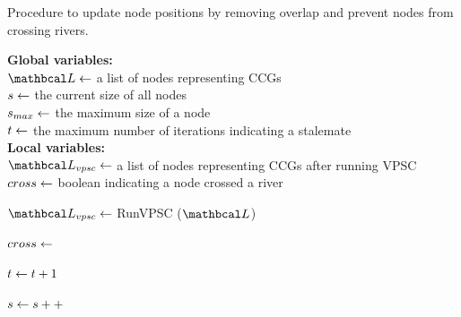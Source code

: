 \begin{algorithm}[tb!]
    \caption{Procedure to update node positions by removing overlap and prevent nodes from crossing rivers.}\label{alg:UpdateNodePosition}
    \textbf{Global variables:} \\
    $ \nodeList \gets $ a list of nodes representing CCGs \\
    $ s \gets $ the current size of all nodes \\
    $ s_{max} \gets $ the maximum size of a node \\
    $ t \gets $ the maximum number of iterations indicating a stalemate \\

    \textbf{Local variables:} \\
    $ \nodeListVPSC \gets $ a list of nodes representing CCGs after running VPSC \\
    $ cross \gets $ boolean indicating a node crossed a river \\

    \begin{algorithmic}[1]
        \While{$ \nodeSize < \nodeSizeMax $}

        \State $ \nodeListVPSC \gets $ RunVPSC ($ \nodeList $)

            \ForEach {$ \nodeListVPSCEach \in \nodeListVPSC $}

                    \State $ cross \gets $ 

                        \State $ t \gets t + 1 $

                        \If{$ \stalemate < \stalemate $}
                            \State {}
                        \Else
                            \State {}
                        \EndIf

                    \EndIf

                \EndIf

            \EndFor

        \EndWhile

        \State $ s \gets s ++$

        \EndProcedure
    \end{algorithmic}
\end{algorithm}


